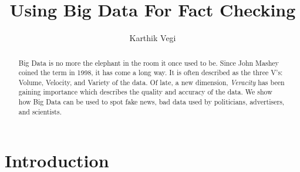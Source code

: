 \documentclass[sigconf]{acmart}
\begin{document}
\title{Using Big Data For Fact Checking}

\author{Karthik Vegi}


\renewcommand{\shortauthors}{kvegi}


\begin{abstract}
Big Data is no more the elephant in the room it once used to be. Since John Mashey coined the term in 1998, it has come a long way. It is often described as the three V's: Volume, Velocity, and Variety of the data. Of late, a new dimension, \textit{Veracity} has been gaining importance which describes the quality and accuracy of the data. We show how Big Data can be used to spot fake news, bad data used by politicians, advertisers, and scientists.
\end{abstract}


\maketitle

\section{Introduction}
\end{document}
